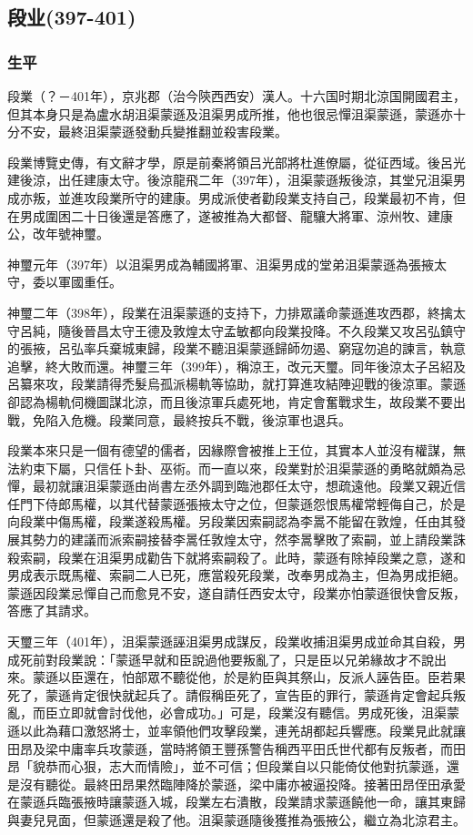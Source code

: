 
\subsection{段业\tiny(397-401)}

\subsubsection{生平}

段業（？－401年），京兆郡（治今陝西西安）漢人。十六国时期北涼国開國君主，但其本身只是為盧水胡沮渠蒙遜及沮渠男成所推，他也很忌憚沮渠蒙遜，蒙遜亦十分不安，最終沮渠蒙遜發動兵變推翻並殺害段業。

段業博覽史傳，有文辭才學，原是前秦將領吕光部將杜進僚屬，從征西域。後呂光建後涼，出任建康太守。後涼龍飛二年（397年），沮渠蒙遜叛後涼，其堂兄沮渠男成亦叛，並進攻段業所守的建康。男成派使者勸段業支持自己，段業最初不肯，但在男成圍困二十日後還是答應了，遂被推為大都督、龍驤大將軍、涼州牧、建康公，改年號神璽。

神璽元年（397年）以沮渠男成為輔國將軍、沮渠男成的堂弟沮渠蒙遜為張掖太守，委以軍國重任。

神璽二年（398年），段業在沮渠蒙遜的支持下，力排眾議命蒙遜進攻西郡，終擒太守呂純，隨後晉昌太守王德及敦煌太守孟敏都向段業投降。不久段業又攻呂弘鎮守的張掖，呂弘率兵棄城東歸，段業不聽沮渠蒙遜歸師勿遏、窮寇勿追的諫言，執意追擊，終大敗而還。神璽三年（399年），稱涼王，改元天璽。同年後涼太子呂紹及呂纂來攻，段業請得禿髮烏孤派楊軌等協助，就打算進攻結陣迎戰的後涼軍。蒙遜卻認為楊軌伺機圖謀北涼，而且後涼軍兵處死地，肯定會奮戰求生，故段業不要出戰，免陷入危機。段業同意，最終按兵不戰，後涼軍也退兵。

段業本來只是一個有德望的儒者，因緣際會被推上王位，其實本人並沒有權謀，無法約束下屬，只信任卜卦、巫術。而一直以來，段業對於沮渠蒙遜的勇略就頗為忌憚，最初就讓沮渠蒙遜由尚書左丞外調到臨池郡任太守，想疏遠他。段業又親近信任門下侍郎馬權，以其代替蒙遜張掖太守之位，但蒙遜怨恨馬權常輕侮自己，於是向段業中傷馬權，段業遂殺馬權。另段業因索嗣認為李暠不能留在敦煌，任由其發展其勢力的建議而派索嗣接替李暠任敦煌太守，然李暠擊敗了索嗣，並上請段業誅殺索嗣，段業在沮渠男成勸告下就將索嗣殺了。此時，蒙遜有除掉段業之意，遂和男成表示既馬權、索嗣二人已死，應當殺死段業，改奉男成為主，但為男成拒絕。蒙遜因段業忌憚自己而愈見不安，遂自請任西安太守，段業亦怕蒙遜很快會反叛，答應了其請求。

天璽三年（401年），沮渠蒙遜誣沮渠男成謀反，段業收捕沮渠男成並命其自殺，男成死前對段業說：「蒙遜早就和臣說過他要叛亂了，只是臣以兄弟緣故才不說出來。蒙遜以臣還在，怕部眾不聽從他，於是約臣與其祭山，反派人誣告臣。臣若果死了，蒙遜肯定很快就起兵了。請假稱臣死了，宣告臣的罪行，蒙遜肯定會起兵叛亂，而臣立即就會討伐他，必會成功。」可是，段業沒有聽信。男成死後，沮渠蒙遜以此為藉口激怒將士，並率領他們攻擊段業，連羌胡都起兵響應。段業見此就讓田昂及梁中庸率兵攻蒙遜，當時將領王豐孫警告稱西平田氏世代都有反叛者，而田昂「貌恭而心狠，志大而情險」，並不可信；但段業自以只能倚仗他對抗蒙遜，還是沒有聽從。最終田昂果然臨陣降於蒙遜，梁中庸亦被逼投降。接著田昂侄田承愛在蒙遜兵臨張掖時讓蒙遜入城，段業左右潰散，段業請求蒙遜饒他一命，讓其東歸與妻兒見面，但蒙遜還是殺了他。沮渠蒙遜隨後獲推為張掖公，繼立為北涼君主。


